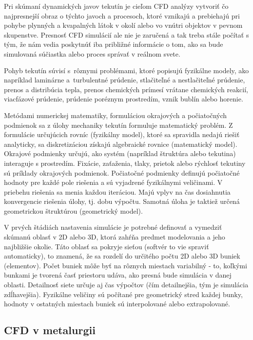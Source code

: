 \documentclass[]{tukediphc}
\begin{document}
Pri skúmaní dynamických javov tekutín je cieľom CFD analýzy vytvoriť čo najpresnejší obraz o týchto javoch a procesoch, ktoré vznikajú a prebiehajú pri pohybe plynných a kvapalných látok v okolí alebo vo vnútri objektov v pevnom skupenstve. Presnosť CFD simulácií ale nie je zaručená a tak treba stále počítať s tým, že nám vedia poskytnúť iba približné informácie o tom, ako sa bude simulovaná súčiastka alebo proces správať v reálnom svete. 

Pohyb tekutín súvisí s~rôznymi problémami, ktoré popisujú fyzikálne modely, ako napríklad laminárne a~turbulentné prúdenie, stlačiteľné a nestlačiteľné prúdenie, prenos a distribúcia tepla, prenos chemických prímesí vrátane chemických reakcií, viacfázové prúdenie, prúdenie poréznym prostredím, vznik bublín alebo horenie.

Metódami numerickej matematiky, formuláciou okrajových a počiatočných podmienok sa z úlohy mechaniky tekutín formuluje matematický problém. Z formulácie určujúcich rovníc (fyzikálny model), ktoré sa spravidla nedajú riešiť analyticky, sa diskretizáciou získajú algebraické rovnice (matematický model). Okrajové podmienky určujú, ako systém (napríklad štruktúra alebo tekutina) interaguje s prostredím. Fixácie, zaťaženia, tlaky, prietok alebo rýchlosť tekutiny sú príklady okrajových podmienok. Počiatočné podmienky definujú počiatočné hodnoty pre každé pole riešenia a sú vyjadrené fyzikálnymi veličinami. V priebehu riešenia sa menia každou iteráciou. Majú vplyv na čas dosiahnutia konvergencie riešenia úlohy, tj. dobu výpočtu. Samotná úloha je taktiež určená geometrickou štruktúrou (geometrický model).

V prvých štádiách nastavenia simulácie je potrebné definovať a vymedziť skúmanú oblasť v 2D alebo 3D, ktorá zahŕňa predmet modelovania a jeho najbližšie okolie. Táto oblasť sa pokryje sieťou (softvér to vie spraviť automaticky), to znamená, že sa rozdelí do určitého počtu 2D alebo 3D buniek (elementov). Počet buniek môže byť na rôznych miestach variabilný - to, koľkými bunkami je tvorená časť priestoru udáva, ako presná bude simulácia v danej oblasti. Detailnosť siete určuje aj čas výpočtov (čím detailnejšia, tým je simulácia zdĺhavejšia). Fyzikálne veličiny sú počítané pre geometrický stred každej bunky, hodnoty v ostatných miestach buniek sú interpolované alebo extrapolované.

\subsection{CFD v metalurgii}
\end{document}
